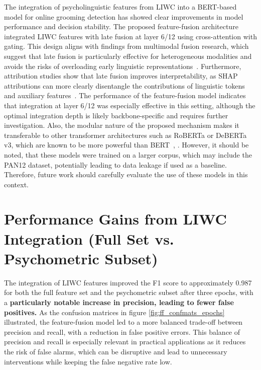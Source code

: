 The integration of psycholinguistic features from LIWC into a BERT-based model for online grooming detection has showed clear improvements in model performance and decision stability. The proposed feature-fusion architecture integrated LIWC features with late fusion at layer 6/12 using cross-attention with gating. This design aligns with findings from multimodal fusion research, which suggest that late fusion is particularly effective for heterogeneous modalities and avoids the risks of overloading early linguistic representations~\cite{shankar2022progressivefusion}. Furthermore, attribution studies show that late fusion improves interpretability, as SHAP attributions can more clearly disentangle the contributions of linguistic tokens and auxiliary features~\cite{shapcat2024interpretable}. The performance of the feature-fusion model indicates that integration at layer 6/12 was especially effective in this setting, although the optimal integration depth is likely backbone-specific and requires further investigation. Also, the modular nature of the proposed mechanism makes it transferable to other transformer architectures such as RoBERTa or DeBERTa v3, which are known to be more powerful than BERT~\cite{liu2019roberta}, \cite{he2023debertav3}. However, it should be noted, that these models were trained on a larger corpus, which may include the PAN12 dataset, potentially leading to data leakage if used as a baseline. Therefore, future work should carefully evaluate the use of these models in this context.

\section{Performance Gains from LIWC Integration (Full Set vs. Psychometric Subset)}

The integration of LIWC features improved the F1 score to approximately 0.987 for both the full feature set and the psychometric subset after three epochs, with a \textbf{particularly notable increase in precision, leading to fewer false positives.} As the confusion matrices in figure \ref{fig:ff_confmats_epochs} illustrated, the feature-fusion model led to a more balanced trade-off between precision and recall, with a reduction in false positive errors. This balance of precision and recall is especially relevant in practical applications as it reduces the risk of false alarms, which can be disruptive and lead to unnecessary interventions while keeping the false negative rate low. 


